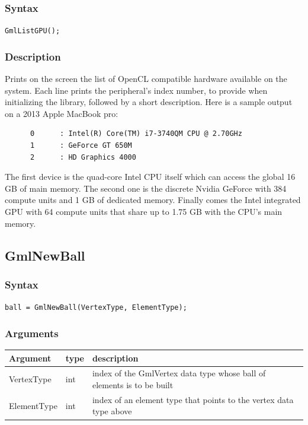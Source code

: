 \documentclass[a4paper,12pt]{article}
\begin{document}
\subsubsection*{Syntax}

{\tt GmlListGPU();}

\subsubsection*{Description}

Prints on the screen the list of OpenCL compatible hardware available on the system.
Each line prints the peripheral's index number, to provide when initializing the library, followed by a short description.
Here is a sample output on a 2013 Apple MacBook pro:

\begin{tt}
\begin{verbatim}
      0      : Intel(R) Core(TM) i7-3740QM CPU @ 2.70GHz
      1      : GeForce GT 650M
      2      : HD Graphics 4000
\end{verbatim}
\end{tt}
\normalfont

The first device is the quad-core Intel CPU itself which can access the global 16 GB of main memory. The second one is the discrete Nvidia GeForce with 384 compute units and 1 GB of dedicated memory. Finally comes the Intel integrated GPU with 64 compute units that share up to 1.75 GB with the CPU's main memory.


\subsection{GmlNewBall}
\subsubsection*{Syntax}
{\tt ball = GmlNewBall(VertexType, ElementType);}
\subsubsection*{Arguments}

\begin{tabular}{|m{2cm}|m{1.5cm}|m{10.5cm}|}
\hline
Argument    & type   & description \\
\hline
VertexType  & int    & index of the GmlVertex data type whose ball of elements is to be built \\
\hline
ElementType & int    & index of an element type that points to the vertex data type above \\
\hline
\end{tabular}
\end{document}
